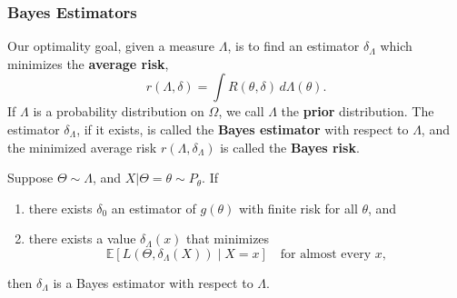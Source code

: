 \subsubsection{Bayes Estimators}
Our optimality goal, given a measure $\Lambda$, is to find an estimator $\delta_\Lambda$ which minimizes the \textbf{average risk},
\[
r(\Lambda, \delta) = \int R(\theta, \delta) \, d\Lambda(\theta).
\]
If $\Lambda$ is a probability distribution on $\Omega$, we call $\Lambda$ the \textbf{prior} distribution. The estimator $\delta_\Lambda$, if it exists, is called the \textbf{Bayes estimator} with respect to $\Lambda$, and the minimized average risk $r(\Lambda, \delta_\Lambda)$ is called the \textbf{Bayes risk}.
\begin{thm}
Suppose $\Theta \sim \Lambda$, and $X | \Theta = \theta \sim P_\theta$. If
\begin{enumerate}
    \item there exists $\delta_0$ an estimator of $g(\theta)$ with finite risk for all $\theta$, and
    \item there exists a value $\delta_\Lambda(x)$ that minimizes
    \[
    \mathbb{E}\left[L(\Theta, \delta_\Lambda(X)) \mid X = x\right] \quad \text{for almost every } x,
    \]
\end{enumerate}
then $\delta_\Lambda$ is a Bayes estimator with respect to $\Lambda$.
\end{thm}
